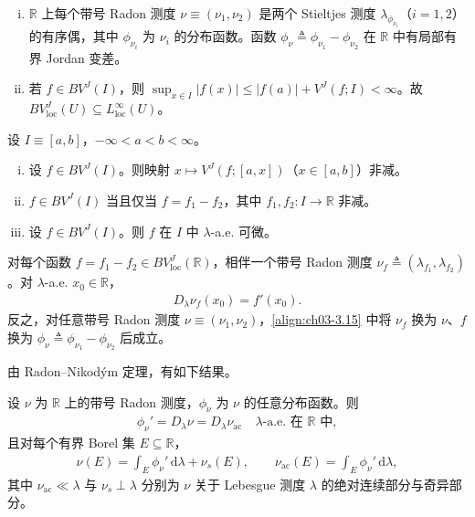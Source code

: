 \documentclass[../../main.tex]{subfiles}%
\begin{document}
\begin{remark}\label{remark:ch03-Stieltjes}
\begin{enumerate}[(i)]
\item $\mathbb{R}$ 上每个带号 Radon 测度 $\nu\equiv(\nu_1,\nu_2)$ 是两个 Stieltjes 测度 $\lambda_{\phi_{\nu_i}}$（$i=1,2$）的有序偶，其中 $\phi_{\nu_i}$ 为 $\nu_i$ 的分布函数。函数 $\phi_\nu\triangleq \phi_{\nu_1}-\phi_{\nu_2}$ 在 $\mathbb{R}$ 中有局部有界 Jordan 变差。
\item 若 $f\in BV^J(I)$，则 $\sup_{x\in I}|f(x)|\leqslant|f(a)|+V^J(f;I)<\infty$。故 $BV^J_{\mathrm{loc}}(U)\subseteq L^\infty_{\mathrm{loc}}(U)$。
\end{enumerate}
\end{remark}

\begin{proposition}\label{proposition:ch03-Jordan性质}
设 $I\equiv[a,b]$，$-\infty<a<b<\infty$。
\begin{enumerate}[(i)]
\item 设 $f\in BV^J(I)$。则映射 $x\mapsto V^J(f;[a,x])$（$x\in[a,b]$）非减。
\item $f\in BV^J(I)$ 当且仅当 $f=f_1-f_2$，其中 $f_1,f_2:I\to\mathbb{R}$ 非减。
\item 设 $f\in BV^J(I)$。则 $f$ 在 $I$ 中 $\lambda$-a.e. 可微。
\end{enumerate}
\end{proposition}

\begin{remark}\label{remark:ch03-RN导数}
对每个函数 $f=f_1-f_2\in BV^J_{\mathrm{loc}}(\mathbb{R})$，相伴一个带号 Radon 测度 $\nu_f\triangleq (\lambda_{f_1},\lambda_{f_2})$。对 $\lambda$-a.e. $x_0\in\mathbb{R}$，
\begin{align}
D_\lambda\nu_f(x_0)=f'(x_0).\label{align:ch03-3.15}
\end{align}
反之，对任意带号 Radon 测度 $\nu\equiv(\nu_1,\nu_2)$，\eqref{align:ch03-3.15} 中将 $\nu_f$ 换为 $\nu$、$f$ 换为 $\phi_\nu\triangleq \phi_{\nu_1}-\phi_{\nu_2}$ 后成立。
\end{remark}

由 Radon--Nikod\'ym 定理，有如下结果。

\begin{theorem}\label{theorem:ch03-Lebesgue分解1D}
设 $\nu$ 为 $\mathbb{R}$ 上的带号 Radon 测度，$\phi_\nu$ 为 $\nu$ 的任意分布函数。则
\begin{align}
\phi_\nu'=D_\lambda\nu=D_\lambda\nu_{\mathrm{ac}}\quad \lambda\text{-a.e. 在 }\mathbb{R}\text{ 中},\label{align:ch03-3.16}
\end{align}
且对每个有界 Borel 集 $E\subseteq\mathbb{R}$，
\begin{align}
\nu(E)=\int_E\phi_\nu'\,\mathrm{d}\lambda+\nu_s(E),\qquad
\nu_{\mathrm{ac}}(E)=\int_E\phi_\nu'\,\mathrm{d}\lambda,\label{align:ch03-3.17}
\end{align}
其中 $\nu_{\mathrm{ac}}\ll\lambda$ 与 $\nu_s\perp\lambda$ 分别为 $\nu$ 关于 Lebesgue 测度 $\lambda$ 的绝对连续部分与奇异部分。
\end{theorem}
\end{document}
